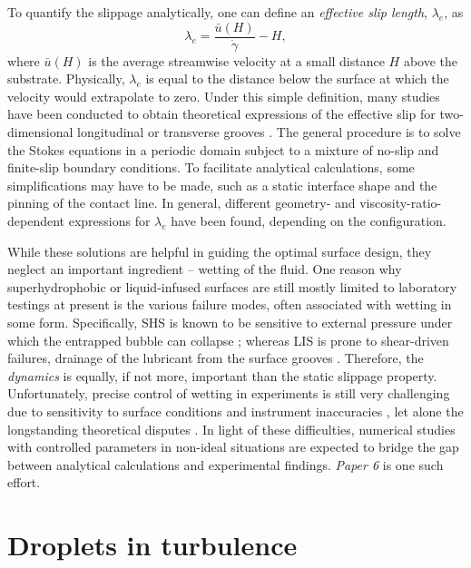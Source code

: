 To quantify the slippage analytically, one can define an \emph{effective slip length}, $\lambda_e$, as
\begin{equation} \label{eff slip}
  \lambda_e = \frac{\bar{u}(H)}{\dot{\gamma}}-H,
\end{equation}
where $\bar{u}(H)$ is the average streamwise velocity at a small distance $H$ above the substrate.
Physically, $\lambda_e$ is equal to the distance below the surface at which the velocity would extrapolate to zero.
Under this simple definition, many studies have been conducted to obtain theoretical expressions of the effective slip for two-dimensional longitudinal or transverse grooves \citep{Lauga_Stone, Sbragalia_Prosperetti, Davis_Lauga, Ng_Wang, Schonecker, Nizkaya, Crowdy_tran, Crowdy_long}.
The general procedure is to solve the Stokes equations in a periodic domain subject to a mixture of no-slip and finite-slip boundary conditions. To facilitate analytical calculations, some simplifications may have to be made, such as a static interface shape and the pinning of the contact line.
In general, different geometry- and viscosity-ratio-dependent expressions for $\lambda_e$ have been found, depending on the configuration.

While these solutions are helpful in guiding the optimal surface design, they neglect an important ingredient -- wetting of the fluid.
One reason why superhydrophobic or liquid-infused surfaces are still mostly limited to laboratory testings at present is the various failure modes, often associated with wetting in some form.
Specifically, SHS is known to be sensitive to external pressure under which the entrapped bubble can collapse \citep{Bocquet}; whereas LIS is prone to shear-driven failures, \ie drainage of the lubricant from the surface grooves \citep{Wexler}.
Therefore, the \emph{dynamics} is equally, if not more, important than the static slippage property.
Unfortunately, precise control of wetting in experiments is still very challenging due to sensitivity to surface conditions and instrument inaccuracies \citep{Liu_vuckovac_etal_2019}, let alone the longstanding theoretical disputes \citep{deGennes_wetting}.
In light of these difficulties, numerical studies with controlled parameters in non-ideal situations are expected to bridge the gap between analytical calculations and experimental findings.
\emph{Paper 6} is one such effort.


\section{Droplets in turbulence}

